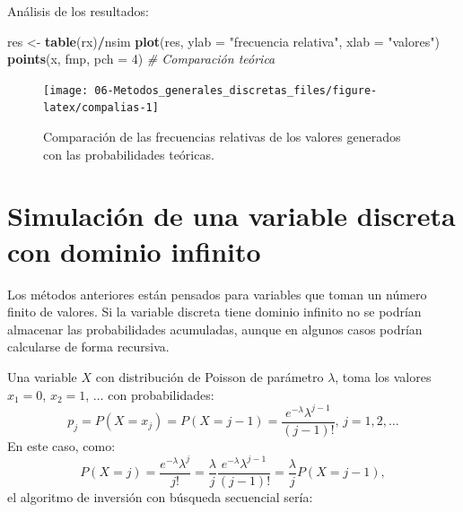 \documentclass[]{book}
\newenvironment{Shaded}{\begin{snugshade}}{\end{snugshade}}
\newcommand{\KeywordTok}[1]{\textcolor[rgb]{0.13,0.29,0.53}{\textbf{#1}}}
\newcommand{\DataTypeTok}[1]{\textcolor[rgb]{0.13,0.29,0.53}{#1}}
\newcommand{\DecValTok}[1]{\textcolor[rgb]{0.00,0.00,0.81}{#1}}
\newcommand{\StringTok}[1]{\textcolor[rgb]{0.31,0.60,0.02}{#1}}
\newcommand{\CommentTok}[1]{\textcolor[rgb]{0.56,0.35,0.01}{\textit{#1}}}
\newcommand{\OperatorTok}[1]{\textcolor[rgb]{0.81,0.36,0.00}{\textbf{#1}}}
\newcommand{\NormalTok}[1]{#1}
\theoremstyle{definition}
\theoremstyle{definition}
\theoremstyle{definition}
\theoremstyle{remark}
\let\BeginKnitrBlock\begin \let\EndKnitrBlock\end
\begin{document}
Análisis de los resultados:

\begin{Shaded}
\begin{Highlighting}[]
\NormalTok{res <-}\StringTok{ }\KeywordTok{table}\NormalTok{(rx)}\OperatorTok{/}\NormalTok{nsim}
\KeywordTok{plot}\NormalTok{(res, }\DataTypeTok{ylab =} \StringTok{"frecuencia relativa"}\NormalTok{, }\DataTypeTok{xlab =} \StringTok{"valores"}\NormalTok{)}
\KeywordTok{points}\NormalTok{(x, fmp, }\DataTypeTok{pch =} \DecValTok{4}\NormalTok{)  }\CommentTok{# Comparación teórica}
\end{Highlighting}
\end{Shaded}

\begin{figure}[!htb]

{\centering \texttt{[image: 06-Metodos\_generales\_discretas\_files/figure-latex/compalias-1]} 

}

\caption{Comparación de las frecuencias relativas de los valores generados con las probabilidades teóricas.}\label{fig:compalias}
\end{figure}

\section{Simulación de una variable discreta con dominio
infinito}\label{simulacion-de-una-variable-discreta-con-dominio-infinito}

Los métodos anteriores están pensados para variables que toman un número
finito de valores. Si la variable discreta tiene dominio infinito no se
podrían almacenar las probabilidades acumuladas, aunque en algunos casos
podrían calcularse de forma recursiva.

\BeginKnitrBlock{example}[distribución de Poisson]
\protect\hypertarget{exm:unnamed-chunk-26}{}{\label{exm:unnamed-chunk-26}
{} }
\EndKnitrBlock{example} Una variable \(X\) con distribución de Poisson
de parámetro \(\lambda\), toma los valores \(x_{1}=0\), \(x_{2}=1\),
\(\ldots\) con probabilidades:
\[p_{j}=P\left( X=x_{j}\right)  =P\left( X=j-1\right)  =\frac{e^{-\lambda
}\lambda^{j-1}}{\left( j-1\right)  !}\text{, }j=1,2,\ldots\] En este
caso, como: \[P\left( X=j\right)  =\frac{e^{-\lambda}\lambda^{j}}{j!}
=\frac{\lambda}{j}\frac{e^{-\lambda}\lambda^{j-1}}{\left( j-1\right)  !}
=\frac{\lambda}{j}P\left( X=j-1\right),\] el algoritmo de inversión con
búsqueda secuencial sería:
\end{document}
